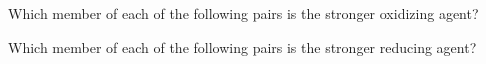 \documentclass[fleqn]{exam}
\begin{document}
\begin{questions}

  \question Which member of each of the following pairs is the stronger oxidizing agent?

  \newpage

  \question Which member of each of the following pairs is the stronger reducing agent?
  \begin{parts}


\end{parts}
\end{questions}
\end{document}
